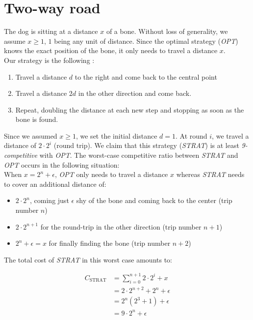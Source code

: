 
\section{Two-way road}
The dog is sitting at a distance $x$ of a bone. Without loss of generality, we assume $x \geq 1$, $1$ being any unit of distance. Since the optimal strategy (\textit{OPT}) knows the exact position of the bone, it only needs to travel a distance $x$.\\

Our strategy is the following :
\begin{enumerate}
  \item Travel a distance $d$ to the right and come back to the central point
  \item Travel a distance $2d$ in the other direction and come back.
  \item Repeat, doubling the distance at each new step and stopping as soon as the bone is found.
\end{enumerate}

Since we assumed $x \geq 1$, we set the initial distance $d = 1$. At round $i$, we travel a distance of $2 \cdot 2^i$ (round trip). We claim that this strategy (\textit{STRAT}) is at least \textit{9-competitive} with \textit{OPT}. The worst-case competitive ratio between \textit{STRAT} and \textit{OPT} occurs in the following situation:\\
When $x = 2^n + \epsilon$, \textit{OPT} only needs to travel a distance $x$ whereas \textit{STRAT} needs to cover an additional distance of:
\begin{itemize}
  \item $2 \cdot 2^n$, coming just $\epsilon$ shy of the bone and coming back to the center (trip number $n$)
  \item $2 \cdot 2^{n+1}$ for the round-trip in the other direction (trip number $n+1$)
  \item $2^n + \epsilon = x$ for finally finding the bone (trip number $n+2$)
\end{itemize}

The total cost of \textit{STRAT} in this worst case amounts to:

\[
\begin{array}{ll}
  C_\text{STRAT} & = \sum_{i=0}^{n+1} {2 \cdot 2^i} + x \\
                 & = 2 \cdot 2^{n+2} + 2^n + \epsilon \\
                 & = 2^n (2^3 + 1) + \epsilon \\
                 & = 9 \cdot 2^n + \epsilon
\end{array}
\]

